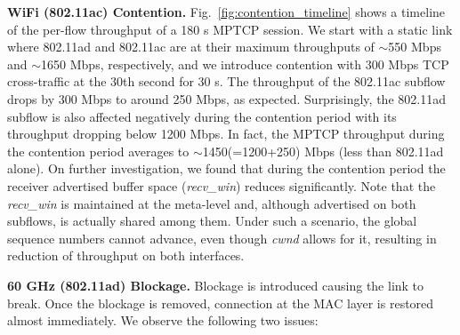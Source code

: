 \noindent\textbf{WiFi (802.11ac) Contention. } Fig.~\ref{fig:contention_timeline} shows a timeline of the
per-flow throughput of a 180 s MPTCP session. We start with a static link where 802.11ad and 802.11ac are 
at their maximum throughputs of $\sim$550 Mbps and $\sim$1650 Mbps, respectively, and we introduce
contention with 300 Mbps TCP cross-traffic at the 30th second for 30 s. The throughput of the 
802.11ac subflow drops by 300 Mbps to around 250 Mbps, as expected. Surprisingly, the 802.11ad subflow is also
affected negatively during the contention period with its throughput dropping below 1200 Mbps.
In fact, the MPTCP throughput during the contention period averages to $\sim$1450(=1200+250) Mbps (less than 802.11ad alone). 
On further investigation, we found that during the contention period the receiver advertised buffer space (\emph{recv\_win}) reduces significantly. 
Note that the \emph{recv\_win} is maintained at the meta-level and, although advertised on both subflows, is actually shared 
among them. Under such a scenario, the global sequence numbers
cannot advance, even though \emph{cwnd} allows for it,
resulting in reduction of throughput on both interfaces.

\begin{figure*}[t]
    \centering
    \hfill
    \hfill
    \vspace{-0.15in}
    \caption{\name}
    \vspace{-0.1in}
\end{figure*}
\fi

\noindent\textbf{60 GHz (802.11ad) Blockage. }
Blockage is introduced 
causing the link to break. 
Once the blockage is removed, connection at the MAC layer
is restored 
almost immediately.
We observe the following two
issues:

